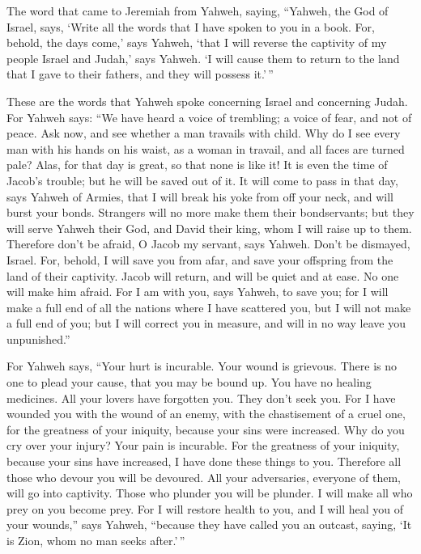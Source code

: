  The word that came to Jeremiah from Yahweh, saying,
 ``Yahweh, the God of Israel, says, `Write all the words
that I have spoken to you in a book.  For, behold, the days
come,' says Yahweh, `that I will reverse the captivity of my people
Israel and Judah,' says Yahweh. `I will cause them to return to the land
that I gave to their fathers, and they will possess it.'\,''

 These are the words that Yahweh spoke concerning Israel and
concerning Judah.  For Yahweh says: ``We have heard a voice
of trembling; a voice of fear, and not of peace.  Ask now,
and see whether a man travails with child. Why do I see every man with
his hands on his waist, as a woman in travail, and all faces are turned
pale?  Alas, for that day is great, so that none is like it!
It is even the time of Jacob's trouble; but he will be saved out of it.
 It will come to pass in that day, says Yahweh of Armies,
that I will break his yoke from off your neck, and will burst your
bonds. Strangers will no more make them their bondservants; 
but they will serve Yahweh their God, and David their king, whom I will
raise up to them.  Therefore don't be afraid, O Jacob my
servant, says Yahweh. Don't be dismayed, Israel. For, behold, I will
save you from afar, and save your offspring from the land of their
captivity. Jacob will return, and will be quiet and at ease. No one will
make him afraid.  For I am with you, says Yahweh, to save
you; for I will make a full end of all the nations where I have
scattered you, but I will not make a full end of you; but I will correct
you in measure, and will in no way leave you unpunished.''

 For Yahweh says, ``Your hurt is incurable. Your wound is
grievous.  There is no one to plead your cause, that you
may be bound up. You have no healing medicines.  All your
lovers have forgotten you. They don't seek you. For I have wounded you
with the wound of an enemy, with the chastisement of a cruel one, for
the greatness of your iniquity, because your sins were increased.
 Why do you cry over your injury? Your pain is incurable.
For the greatness of your iniquity, because your sins have increased, I
have done these things to you.  Therefore all those who
devour you will be devoured. All your adversaries, everyone of them,
will go into captivity. Those who plunder you will be plunder. I will
make all who prey on you become prey.  For I will restore
health to you, and I will heal you of your wounds,'' says Yahweh,
``because they have called you an outcast, saying, `It is Zion, whom no
man seeks after.'\,''

